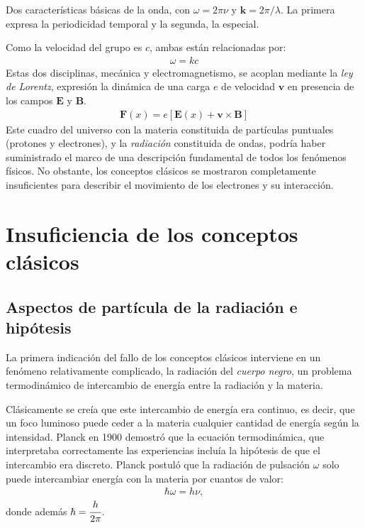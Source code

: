 \documentclass[../main]{subfiles}
\begin{document}
Dos características básicas de la onda, con $\omega=2\pi\nu$ y $\boldsymbol{k}=2\pi/\lambda$. La primera expresa la periodicidad temporal y la segunda, la especial.

Como la velocidad del grupo es $c$, ambas están relacionadas por:
\begin{align}
    \omega=kc
\end{align}
Estas dos disciplinas, mecánica y electromagnetismo, se acoplan mediante la \textit{ley de Lorentz}, expresión la dinámica de una carga $e$ de velocidad $\boldsymbol{v}$ en presencia de los campos $\boldsymbol{E}$ y $\boldsymbol{B}$.
\begin{align}
    \boldsymbol{F}(x)=e\left[\boldsymbol{E}(x) + \boldsymbol{v}\times\boldsymbol{B}\right]
\end{align}
Este cuadro del universo con la materia constituida de partículas puntuales (protones y electrones), y la \textit{radiación} constituida de ondas, podría haber suministrado el marco de una descripción fundamental de todos los fenómenos físicos. No obstante, los conceptos clásicos se mostraron completamente insuficientes para describir el movimiento de los electrones y su interacción.

\section{Insuficiencia de los conceptos clásicos}
\subsection{Aspectos de partícula de la radiación e hipótesis}
La primera indicación del fallo de los conceptos clásicos interviene en un fenómeno relativamente complicado, la radiación del \textit{cuerpo negro}, un problema termodinámico de intercambio de energía entre la radiación y la materia.

Clásicamente se creía que este intercambio de energía era continuo, es decir, que un foco luminoso puede ceder a la materia cualquier cantidad de energía según la intensidad. Planck en 1900 demostró que la ecuación termodinámica, que interpretaba correctamente las experiencias incluía la hipótesis de que el intercambio era discreto. Planck postuló que la radiación de pulsación $\omega$ solo puede intercambiar energía con la materia por cuantos de valor:
\begin{align}
    \hbar\omega=h\nu, \label{eq1}
\end{align}
donde además $\hbar=\cfrac{h}{2\pi}$.
\end{document}
